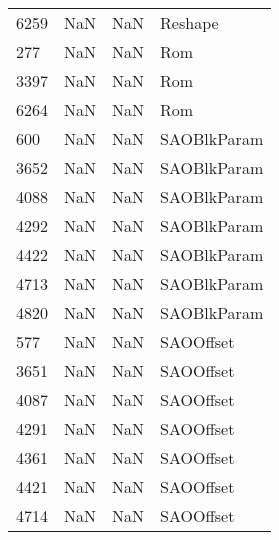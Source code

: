 \begin{tabular}{llll}
6259 &                   NaN &                        NaN &                                   Reshape \\
277  &                   NaN &                        NaN &                                       Rom \\
3397 &                   NaN &                        NaN &                                       Rom \\
6264 &                   NaN &                        NaN &                                       Rom \\
600  &                   NaN &                        NaN &                               SAOBlkParam \\
3652 &                   NaN &                        NaN &                               SAOBlkParam \\
4088 &                   NaN &                        NaN &                               SAOBlkParam \\
4292 &                   NaN &                        NaN &                               SAOBlkParam \\
4422 &                   NaN &                        NaN &                               SAOBlkParam \\
4713 &                   NaN &                        NaN &                               SAOBlkParam \\
4820 &                   NaN &                        NaN &                               SAOBlkParam \\
577  &                   NaN &                        NaN &                                 SAOOffset \\
3651 &                   NaN &                        NaN &                                 SAOOffset \\
4087 &                   NaN &                        NaN &                                 SAOOffset \\
4291 &                   NaN &                        NaN &                                 SAOOffset \\
4361 &                   NaN &                        NaN &                                 SAOOffset \\
4421 &                   NaN &                        NaN &                                 SAOOffset \\
4714 &                   NaN &                        NaN &                                 SAOOffset \\

\end{tabular}
